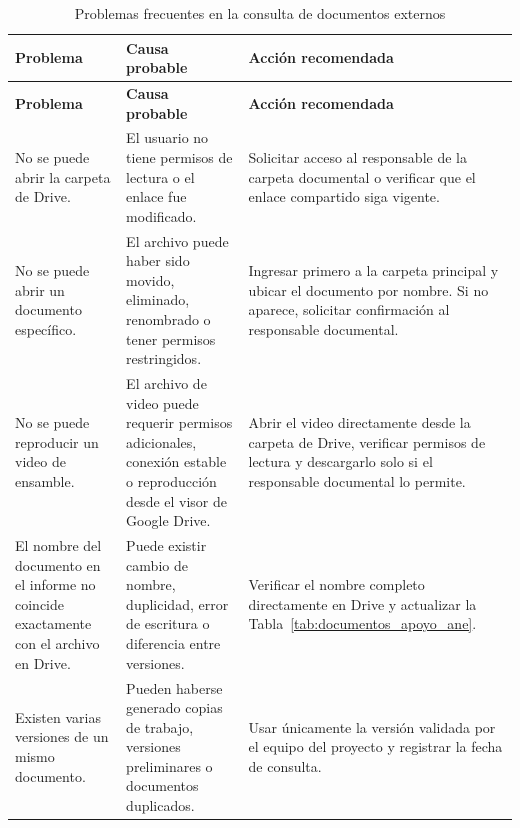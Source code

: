 \begin{longtable}{p{} p{} p{}}
\caption{Problemas frecuentes en la consulta de documentos externos}
\label{tab:problemas_documentos_apoyo}\\

\hline
\textbf{Problema} & \textbf{Causa probable} & \textbf{Acción recomendada} \\
\hline
\endfirsthead

\hline
\textbf{Problema} & \textbf{Causa probable} & \textbf{Acción recomendada} \\
\hline
\endhead

No se puede abrir la carpeta de Drive. &
El usuario no tiene permisos de lectura o el enlace fue modificado. &
Solicitar acceso al responsable de la carpeta documental o verificar que el enlace compartido siga vigente. \\

\hline

No se puede abrir un documento específico. &
El archivo puede haber sido movido, eliminado, renombrado o tener permisos restringidos. &
Ingresar primero a la carpeta principal y ubicar el documento por nombre. Si no aparece, solicitar confirmación al responsable documental. \\

\hline

No se puede reproducir un video de ensamble. &
El archivo de video puede requerir permisos adicionales, conexión estable o reproducción desde el visor de Google Drive. &
Abrir el video directamente desde la carpeta de Drive, verificar permisos de lectura y descargarlo solo si el responsable documental lo permite. \\

\hline

El nombre del documento en el informe no coincide exactamente con el archivo en Drive. &
Puede existir cambio de nombre, duplicidad, error de escritura o diferencia entre versiones. &
Verificar el nombre completo directamente en Drive y actualizar la Tabla~\ref{tab:documentos_apoyo_ane}. \\

\hline

Existen varias versiones de un mismo documento. &
Pueden haberse generado copias de trabajo, versiones preliminares o documentos duplicados. &
Usar únicamente la versión validada por el equipo del proyecto y registrar la fecha de consulta. \\


\end{longtable}

